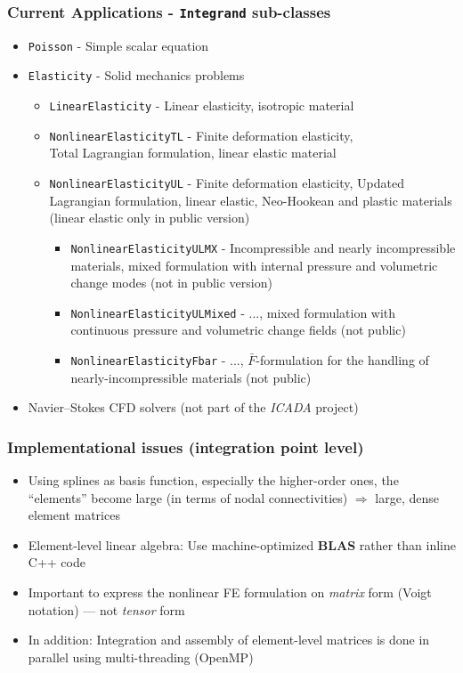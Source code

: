 \documentclass{beamer}
\def\classitem#1{\item{\color{red}\tt#1} -}
\begin{document}
\frame %
{
 \frametitle{Current Applications - {\color{red}\tt Integrand} sub-classes}

 \small
 \begin{itemize}
  \classitem{Poisson} Simple scalar equation

  \pause
  \classitem{Elasticity} Solid mechanics problems
  \begin{itemize}
   \classitem{LinearElasticity} Linear elasticity, isotropic material
   \classitem{NonlinearElasticityTL} Finite deformation elasticity, \\
    Total Lagrangian formulation, linear elastic material
   \classitem{NonlinearElasticityUL} Finite deformation elasticity,
    Updated Lagrangian formulation, linear elastic, Neo-Hookean and
    plastic materials (linear elastic only in public version)
   \pause
   \begin{itemize}
    \classitem{NonlinearElasticityULMX} Incompressible and nearly incompressible
     materials, mixed formulation with internal pressure and volumetric change
     modes (not in public version)
    \classitem{NonlinearElasticityULMixed} ...,
     mixed formulation with continuous pressure and volumetric change fields
     (not public) \\
    \classitem{NonlinearElasticityFbar} ...,
     $\bar{F}$-formulation for the handling of nearly-incompressible materials
     (not public)
   \end{itemize}
  \end{itemize}

  \pause
  \item Navier--Stokes CFD solvers (not part of the {\sl ICADA\/} project)
 \end{itemize}
}

\frame %
{
 \frametitle{Implementational issues (integration point level)}

 \begin{itemize}
  \item<1-> Using splines as basis function, especially the higher-order ones,
            the ``elements'' become large (in terms of nodal connectivities)
            $\Rightarrow$ large, dense element matrices
  \item<2-> Element-level linear algebra: Use machine-optimized {\bf BLAS}
            rather than inline C++ code
  \item<2-> Important to express the nonlinear FE formulation on {\em matrix}
            form (Voigt notation) --- not {\em tensor} form
  \item<3-> In addition: Integration and assembly of element-level matrices
            is done in parallel using multi-threading (OpenMP)
 \end{itemize}
}
\end{document}
